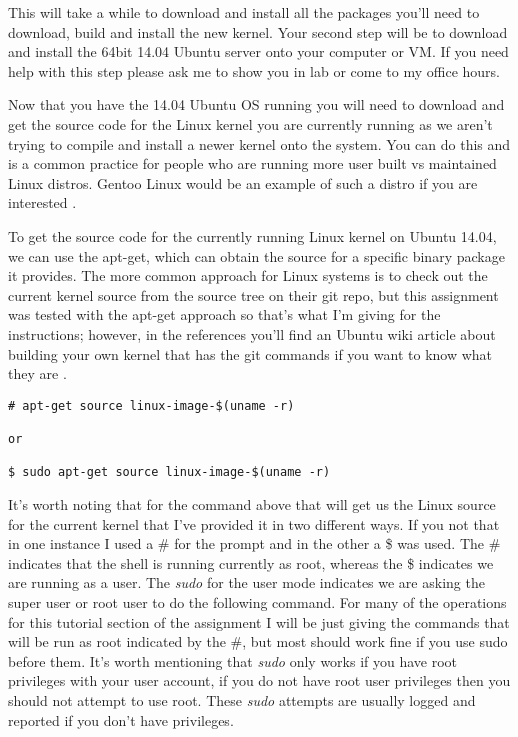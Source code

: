 \documentclass[11pt]{article}
\begin{document}
This will take a while to download and install all the packages you'll need to download, build and install the new kernel. Your second step will be to download and install the 64bit 14.04 Ubuntu server \cite{ubuntuserver} onto your computer or VM. If you need help with this step please ask me to show you in lab or come to my office hours. 

Now that you have the 14.04 Ubuntu OS running you will need to download and get the source code for the Linux kernel you are currently running as we aren't trying to compile and install a newer kernel onto the system. You can do this and is a common practice for people who are running more user built vs maintained Linux distros. Gentoo Linux would be an example of such a distro if you are interested \cite{gentoo}. 

To get the source code for the currently running Linux kernel on Ubuntu 14.04, we can use the apt-get, which can obtain the source for a specific binary package it provides. The more common approach for Linux systems is to check out the current kernel source from the source tree on their git repo, but this assignment was tested with the apt-get approach so that's what I'm giving for the instructions; however, in the references you'll find an Ubuntu wiki article about building your own kernel that has the git commands if you want to know what they are \cite{ubuntukernel}.

\begin{verbatim}
# apt-get source linux-image-$(uname -r)

or

$ sudo apt-get source linux-image-$(uname -r)
\end{verbatim}

It's worth noting that for the command above that will get us the Linux source for the current kernel that I've provided it in two different ways. If you not that in one instance I used a \# for the prompt and in the other a \$ was used. The \# indicates that the shell is running currently as root, whereas the \$ indicates we are running as a user. The \emph{sudo} for the user mode indicates we are asking the super user or root user to do the following command. For many of the operations for this tutorial section of the assignment I will be just giving the commands that will be run as root indicated by the \#, but most should work fine if you use sudo before them. It's worth mentioning that \emph{sudo} only works if you have root privileges with your user account, if you do not have root user privileges then you should not attempt to use root. These \emph{sudo} attempts are usually logged and reported if you don't have privileges. 
\end{document}
